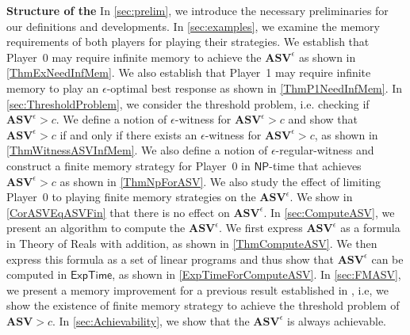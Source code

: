 \textbf{Structure of the \mydoc} In \cref{sec:prelim}, we introduce the necessary preliminaries for our definitions and developments. 
In \cref{sec:examples}, we examine the memory requirements of both players for playing their strategies. We establish that Player~0 may require infinite memory to achieve the $\mathbf{ASV}^{\epsilon}$ as shown in \cref{ThmExNeedInfMem}. We also establish that Player~1 may require infinite memory to play an $\epsilon$-optimal best response as shown in \cref{ThmP1NeedInfMem}. 
In \cref{sec:ThresholdProblem}, we consider the threshold problem, i.e. checking if $\mathbf{ASV}^{\epsilon} > c$. We define a notion of $\epsilon$-witness for $\mathbf{ASV}^{\epsilon} > c$ and show that $\mathbf{ASV}^{\epsilon} > c$ if and only if there exists an $\epsilon$-witness for $\mathbf{ASV}^{\epsilon} > c$, as shown in \cref{ThmWitnessASVInfMem}. We also define a notion of $\epsilon$-regular-witness and construct a finite memory strategy for Player~0 in $\mathsf{NP}$-time that achieves $\mathbf{ASV}^{\epsilon} > c$ as shown in \cref{ThmNpForASV}. We also study the effect of limiting Player~0 to playing finite memory strategies on the $\mathbf{ASV}^{\epsilon}$. We show in \cref{CorASVEqASVFin} that there is no effect on $\mathbf{ASV}^{\epsilon}$.
In \cref{sec:ComputeASV}, we present an algorithm to compute the $\mathbf{ASV}^{\epsilon}$. We first express $\mathbf{ASV}^{\epsilon}$ as a formula in Theory of Reals with addition, as shown in \cref{ThmComputeASV}. We then express this formula as a set of linear programs and thus show that $\mathbf{ASV}^{\epsilon}$ can be computed in $\mathsf{ExpTime}$, as shown in \cref{ExpTimeForComputeASV}.
In \cref{sec:FMASV}, we present a memory improvement for a previous result established in \cite{FGR20}, i.e, we show the existence of finite memory strategy to achieve the threshold problem of $\mathbf{ASV} > c$. 
In \cref{sec:Achievability}, we show that the $\mathbf{ASV}^{\epsilon}$ is always achievable.